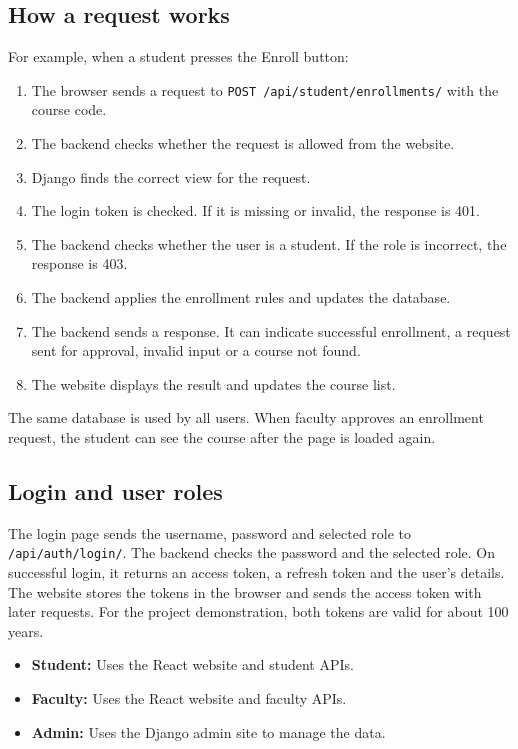 \documentclass[11pt,a4paper]{article}
\begin{document}
\subsection{How a request works}
For example, when a student presses the Enroll button:
\begin{enumerate}
    \item The browser sends a request to
    \texttt{POST /api/student/enrollments/} with the course code.
    \item The backend checks whether the request is allowed from the website.
    \item Django finds the correct view for the request.
    \item The login token is checked. If it is missing or invalid, the response
    is 401.
    \item The backend checks whether the user is a student. If the role is
    incorrect, the response is 403.
    \item The backend applies the enrollment rules and updates the database.
    \item The backend sends a response. It can indicate successful enrollment,
    a request sent for approval, invalid input or a course not found.
    \item The website displays the result and updates the course list.
\end{enumerate}

The same database is used by all users. When faculty approves an enrollment
request, the student can see the course after the page is loaded again.

\subsection{Login and user roles}
The login page sends the username, password and selected role to
\texttt{/api/auth/login/}. The backend checks the password and the selected
role. On successful login, it returns an access token, a refresh token and
the user's details. The website stores the tokens in the browser and sends the
access token with later requests. For the project demonstration, both tokens
are valid for about 100 years.

\begin{itemize}
    \item \textbf{Student:} Uses the React website and student APIs.
    \item \textbf{Faculty:} Uses the React website and faculty APIs.
    \item \textbf{Admin:} Uses the Django admin site to manage the data.
\end{itemize}
\end{document}
